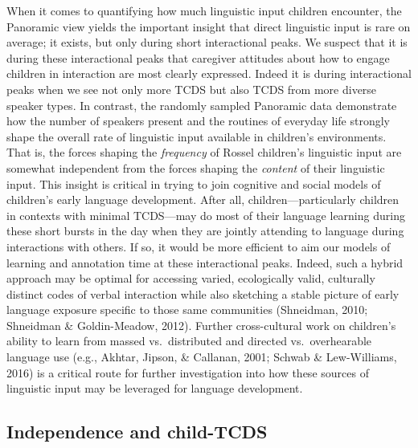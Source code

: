 \documentclass[,man,floatsintext]{apa6}
\begin{document}
When it comes to quantifying how much linguistic input children
encounter, the Panoramic view yields the important insight that direct
linguistic input is rare on average; it exists, but only during short
interactional peaks. We suspect that it is during these interactional
peaks that caregiver attitudes about how to engage children in
interaction are most clearly expressed. Indeed it is during
interactional peaks when we see not only more TCDS but also TCDS from
more diverse speaker types. In contrast, the randomly sampled Panoramic
data demonstrate how the number of speakers present and the routines of
everyday life strongly shape the overall rate of linguistic input
available in children's environments. That is, the forces shaping the
\emph{frequency} of Rossel children's linguistic input are somewhat
independent from the forces shaping the \emph{content} of their
linguistic input. This insight is critical in trying to join cognitive
and social models of children's early language development. After all,
children---particularly children in contexts with minimal TCDS---may do
most of their language learning during these short bursts in the day
when they are jointly attending to language during interactions with
others. If so, it would be more efficient to aim our models of learning
and annotation time at these interactional peaks. Indeed, such a hybrid
approach may be optimal for accessing varied, ecologically valid,
culturally distinct codes of verbal interaction while also sketching a
stable picture of early language exposure specific to those same
communities (Shneidman, 2010; Shneidman \& Goldin-Meadow, 2012). Further
cross-cultural work on children's ability to learn from massed
vs.~distributed and directed vs.~overhearable language use (e.g.,
Akhtar, Jipson, \& Callanan, 2001; Schwab \& Lew-Williams, 2016) is a
critical route for further investigation into how these sources of
linguistic input may be leveraged for language development.

\subsection{Independence and
child-TCDS}\label{independence-and-child-tcds}
\end{document}
